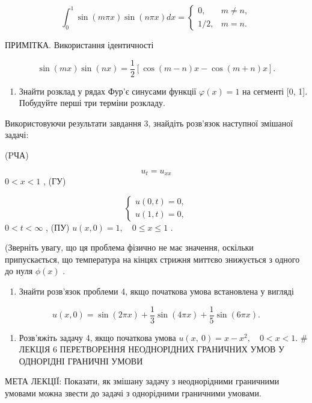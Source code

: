 \documentclass[
  ukrainian,
]{article}
\providecommand{\tightlist}{%
  \setlength{\itemsep}{0pt}\setlength{\parskip}{0pt}}
\begin{document}
\[\int_0^1 \sin(m\pi x) \sin(n\pi x) dx = \begin{cases} 0, & m \neq n, \\ 1/2, & m = n. \end{cases}\]

ПРИМІТКА. Використання ідентичності

\[\sin(mx)\sin(nx) = \frac{1}{2}[\cos(m-n)x - \cos(m+n)x].\]

\begin{enumerate}
\def\labelenumi{\arabic{enumi}.}
\setcounter{enumi}{2}
\tightlist
\item
  Знайти розклад у рядах Фур'є синусами функції \(\varphi(x) = 1\) на
  сегменті {[}0, 1{]}. Побудуйте перші три терміни розкладу.
\end{enumerate}

Використовуючи результати завдання 3, знайдіть розв'язок наступної
змішаної задачі:

(PЧА)

\[u_t = u_{xx}\] \(0 < x < 1\) , (ГУ)

\[\begin{cases} u(0, t) = 0, \\ u(1, t) = 0, \end{cases}\]
\(0 < t < \infty\) , (ПУ) \(u(x, 0) = 1, \quad 0 \le x \le 1\) .

(Зверніть увагу, що ця проблема фізично не має значення, оскільки
припускається, що температура на кінцях стрижня миттєво знижується з
одного до нуля \(\phi(x)\) .

\begin{enumerate}
\def\labelenumi{\arabic{enumi}.}
\setcounter{enumi}{4}
\tightlist
\item
  Знайти розв'язок проблеми 4, якщо початкова умова встановлена у
  вигляді
\end{enumerate}

\[u(x, 0) = \sin(2\pi x) + \frac{1}{3}\sin(4\pi x) + \frac{1}{5}\sin(6\pi x).\]

\begin{enumerate}
\def\labelenumi{\arabic{enumi}.}
\setcounter{enumi}{5}
\tightlist
\item
  Розв'яжіть задачу 4, якщо початкова умова
  \(u\left( x,\ 0\right) =x-x^{2},\quad 0< x<1.\) \# ЛЕКЦІЯ 6
  ПЕРЕТВОРЕННЯ НЕОДНОРІДНИХ ГРАНИЧНИХ УМОВ У ОДНОРІДНІ ГРАНИЧНІ УМОВИ
\end{enumerate}

МЕТА ЛЕКЦІЇ: Показати, як змішану задачу з неоднорідними граничними
умовами можна звести до задачі з однорідними граничними умовами.
\end{document}
